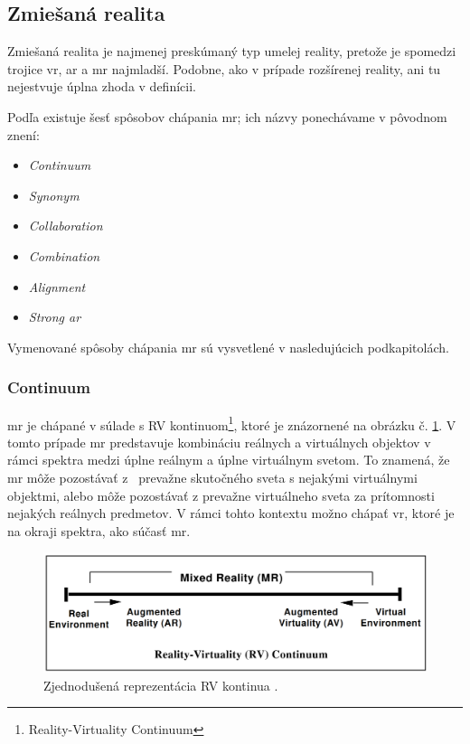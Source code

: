 \subsection{Zmiešaná realita}
Zmiešaná realita je najmenej preskúmaný typ umelej reality, pretože je spomedzi trojice \acrshort{vr}, \acrshort{ar} a \acrshort{mr} najmladší. Podobne, ako v prípade
rozšírenej reality, ani tu nejestvuje úplna zhoda v definícii. 

Podľa \cite{speicherWhatMixedReality2019a} existuje šesť spôsobov chápania \acrshort{mr}; ich názvy ponechávame v pôvodnom znení:
\begin{itemize}
  \item \emph{Continuum}
  \item \emph{Synonym}
  \item \emph{Collaboration}
  \item \emph{Combination}
  \item \emph{Alignment}
  \item \emph{Strong \acrshort{ar}}
\end{itemize}

\noindent Vymenované spôsoby chápania \acrshort{mr} sú vysvetlené v nasledujúcich podkapitolách.

\subsubsection*{Continuum}
\acrshort{mr} je chápané v súlade s RV kontinuom\footnote{Reality-Virtuality Continuum}, ktoré je znázornené na obrázku č. \ref{rv-continuum}. V tomto prípade \acrshort{mr}
predstavuje kombináciu reálnych a virtuálnych objektov v rámci spektra medzi úplne reálnym a úplne virtuálnym svetom. To znamená, že \acrshort{mr} môže pozostávať z~
prevažne skutočného sveta s nejakými virtuálnymi objektmi, alebo môže pozostávať z prevažne virtuálneho sveta za prítomnosti nejakých reálnych predmetov. V rámci tohto
kontextu možno chápať \acrshort{vr}, ktoré je na okraji spektra, ako súčasť \acrshort{mr}.

\begin{figure}[!htbp]
  \centering
  \includegraphics[width=12cm]{img/continuum.png}
  \caption{Zjednodušená reprezentácia RV kontinua \cite{milgramAugmentedRealityClass1995}.}
  \label{rv-continuum}
\end{figure}	

